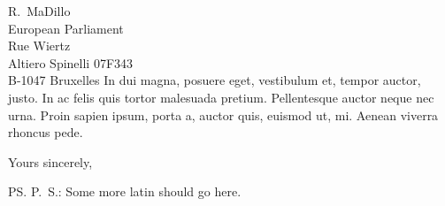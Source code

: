 \documentclass[a4paper,12pt]{letter}
\begin{document}
\begin{letter}{
	R.\ MaDillo\\
	European Parliament\\
	Rue Wiertz\\
	Altiero Spinelli 07F343\\
	B-1047 Bruxelles 
}
	In dui magna, posuere eget, vestibulum et, tempor auctor, justo. In ac felis 
	quis tortor malesuada pretium. Pellentesque auctor neque nec urna. Proin 
	sapien ipsum, porta a, auctor quis, euismod ut, mi. Aenean viverra rhoncus 
	pede. 

%
%

%
%
\closing{Yours sincerely,} %
\ps{P.\ S.: Some more latin should go here.} %

%
%

\vspace{1cm}
\begingroup
\def\enotesize{\small}
\def\enoteheading{\Large \textsc{Notes}}
\theendnotes
\endgroup

\end{letter}
\end{document}
